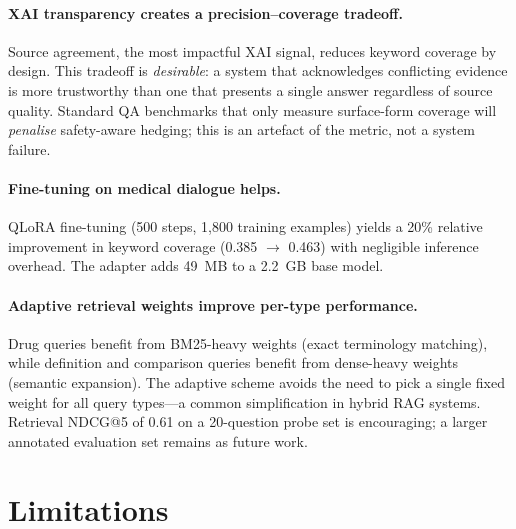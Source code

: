 \documentclass[10pt,twocolumn]{article}
\begin{document}
\paragraph{XAI transparency creates a precision--coverage tradeoff.}
Source agreement, the most impactful XAI signal, reduces keyword coverage by
design.  This tradeoff is \emph{desirable}: a system that acknowledges
conflicting evidence is more trustworthy than one that presents a single
answer regardless of source quality.  Standard QA benchmarks that only
measure surface-form coverage will \emph{penalise} safety-aware hedging;
this is an artefact of the metric, not a system failure.

\paragraph{Fine-tuning on medical dialogue helps.}
QLoRA fine-tuning (500 steps, 1,800 training examples) yields a 20\% relative
improvement in keyword coverage (0.385 $\to$ 0.463) with negligible inference
overhead.  The adapter adds 49~MB to a 2.2~GB base model.

\paragraph{Adaptive retrieval weights improve per-type performance.}
Drug queries benefit from BM25-heavy weights (exact terminology matching), while
definition and comparison queries benefit from dense-heavy weights (semantic
expansion).  The adaptive scheme avoids the need to pick a single fixed weight
for all query types---a common simplification in hybrid RAG systems.  Retrieval
NDCG@5 of 0.61 on a 20-question probe set is encouraging; a larger annotated
evaluation set remains as future work.

\section{Limitations}
\label{sec:limitations}
\end{document}
